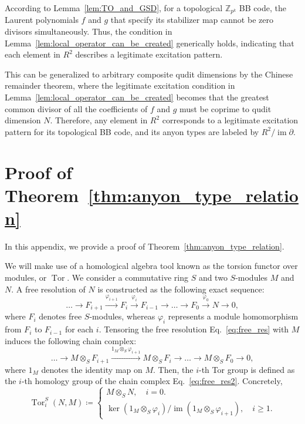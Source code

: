 \documentclass[aps,prb,english,superscriptaddress,twocolumn,tightenlines,showpacs,longbibliography,floatfix,amsfonts]{revtex4-2}
\newcommand{\im}{\operatorname{im}}
\newcommand{\pt}{\partial}
\begin{document}
According to Lemma~\ref{lem:TO_and_GSD}, for a topological $\mathbb{Z}_{p^k}$ BB code, the Laurent polynomials $f$ and $g$ that specify its stabilizer map cannot be zero divisors simultaneously. Thus, the condition in Lemma~\ref{lem:local_operator_can_be_created} generically holds, indicating that each element in $R^2$ describes a legitimate excitation pattern. 

This can be generalized to arbitrary composite qudit dimensions by the Chinese remainder theorem, where the legitimate excitation condition in Lemma~\ref{lem:local_operator_can_be_created} becomes that the greatest common divisor of all the coefficients of $f$ and $g$ must be coprime to qudit dimension $N$. Therefore, any element in $R^2$ corresponds to a legitimate excitation pattern for its topological BB code, and its anyon types are labeled by $R^2/\im\pt$.



\section{Proof of Theorem~\ref{thm:anyon_type_relation}\label{app2.5}}

In this appendix, we provide a proof of Theorem~\ref{thm:anyon_type_relation}. 


We will make use of a homological algebra tool known as the torsion functor over modules, or $\operatorname{Tor}$. We consider a commutative ring $S$ and two $S$-modules $M$ and $N$. A free resolution of $N$ is constructed as the following exact sequence:
\begin{equation}
    \dots \to F_{i+1}\xrightarrow{\varphi_{i+1}}F_i\xrightarrow{\varphi_{i}}F_{i-1}\to\dots\to F_0\xrightarrow{\varphi_0} N\to 0,\label{eq:free_res}
\end{equation}
where $F_i$ denotes free $S$-modules, whereas $\varphi_i$ represents a module homomorphism from $F_{i}$ to $F_{i-1}$ for each $i$. Tensoring the free resolution Eq.~\eqref{eq:free_res} with $M$ induces the following chain complex: 
\begin{equation}
    \dots \to M\otimes_S F_{i+1}\xrightarrow{1_M\otimes_S\varphi_{i+1}}M\otimes_S F_i\to\dots\to M\otimes_
    SF_0\to 0,\label{eq:free_res2}
\end{equation}
where $1_M$ denotes the identity map on $M$. Then, the $i$-th Tor group is defined as the $i$-th homology group of the chain complex Eq.~\eqref{eq:free_res2}. Concretely, 
\begin{equation}
    \operatorname{Tor}_{i}^S(N,M)\coloneqq \begin{cases}
        M\otimes_S N,\quad i=0.\\    \ker(1_M\otimes_S\varphi_{i})/\im(1_M\otimes_S\varphi_{i+1}),\quad i\geq 1.
    \end{cases}
\end{equation}
  
\end{document}
